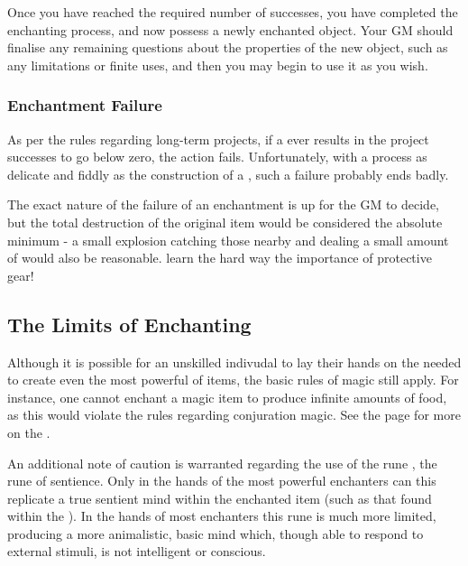 Once you have reached the required number of successes, you have completed the enchanting process, and now possess a newly enchanted object. Your GM should finalise any remaining questions about the properties of the new object, such as any limitations or finite uses, and then you may begin to use it as you wish.


\subsubsection{Enchantment Failure}

As per the rules regarding long-term projects, if a  ever results in the project successes to go below zero, the action fails. Unfortunately, with a process as delicate and fiddly as the construction of a , such a failure probably ends badly. 

The exact nature of the failure of an enchantment is up for the GM to decide, but the total destruction of the original item would be considered the absolute minimum - a small explosion catching those nearby and dealing a small amount of  would also be reasonable.  learn the hard way the importance of protective gear!







\subsection{The Limits of Enchanting}

Although it is possible for an unskilled indivudal to lay their hands on the  needed to create even the most powerful of items, the basic rules of magic still apply. For instance, one cannot enchant a magic item to produce infinite amounts of food, as this would violate the rules regarding conjuration magic. See the page \pageref{S:Laws} for more on the .

An additional note of caution is warranted regarding the use of the rune \rune{\animax}, the rune of sentience. Only in the hands of the most powerful enchanters can this replicate a true sentient mind within the enchanted item (such as that found within the  ). In the hands of most enchanters this rune is much more limited, producing a more animalistic, basic mind which, though able to respond to external stimuli, is not intelligent or conscious.  


